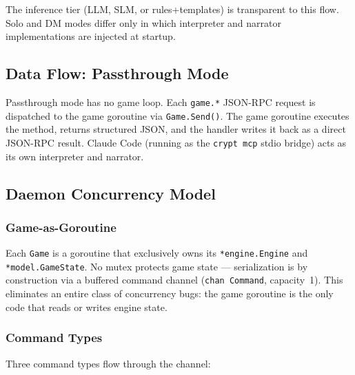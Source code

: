 \documentclass[a4paper,10pt]{article}
\newcommand{\cmd}[1]{\texttt{#1}}
\begin{document}
The inference tier (LLM, SLM, or rules+templates) is transparent to
this flow.  Solo and DM modes differ only in which interpreter and
narrator implementations are injected at startup.

\subsection{Data Flow: Passthrough Mode}

Passthrough mode has no game loop.  Each \texttt{game.*} JSON-RPC
request is dispatched to the game goroutine via \texttt{Game.Send()}.
The game goroutine executes the method, returns structured JSON,
and the handler writes it back as a direct JSON-RPC result.  Claude
Code (running as the \cmd{crypt mcp} stdio bridge) acts as its own
interpreter and narrator.

\subsection{Daemon Concurrency Model}

\subsubsection{Game-as-Goroutine}

Each \texttt{Game} is a goroutine that exclusively owns its
\texttt{*engine.Engine} and \texttt{*model.GameState}.  No mutex
protects game state --- serialization is by construction via a
buffered command channel (\texttt{chan Command}, capacity~1).
This eliminates an entire class of concurrency bugs: the game
goroutine is the only code that reads or writes engine state.

\subsubsection{Command Types}

Three command types flow through the channel:
\end{document}
